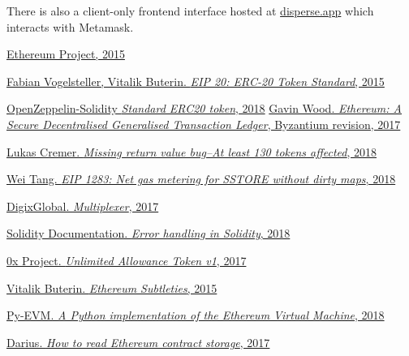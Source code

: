 \documentclass[12pt]{article}
\begin{document}
There is also a client-only frontend interface hosted at \href{https://disperse.app/}{disperse.app} which interacts with Metamask.

\begin{thebibliography}{1}

 \href{https://www.ethereum.org}{Ethereum Project, 2015}
 
  \href{https://eips.ethereum.org/EIPS/eip-20}{Fabian Vogelsteller, Vitalik Buterin. {\em EIP 20: ERC-20 Token Standard}, 2015}

  \href{https://github.com/OpenZeppelin/openzeppelin-solidity/blob/v2.0.0/contracts/token/ERC20/ERC20.sol#L151-L164}{OpenZeppelin-Solidity {\em Standard ERC20 token}, 2018}
  \href{http://gavwood.com/paper.pdf}{Gavin Wood. {\em Ethereum: A Secure Decentralised Generalised Transaction Ledger}, Byzantium revision, 2017}
 	
  \href{https://medium.com/p/d67bf08521ca}{Lukas Cremer. {\em Missing return value bug--At least 130 tokens affected}, 2018}
 	
  \href{https://eips.ethereum.org/EIPS/eip-1283}{Wei Tang. {\em EIP 1283: Net gas metering for SSTORE without dirty maps}, 2018}
 	
  \href{https://github.com/DigixGlobal/multiplexer}{DigixGlobal. {\em Multiplexer}, 2017}
 	
  \href{https://solidity.readthedocs.io/en/latest/control-structures.html#error-handling-assert-require-revert-and-exceptions}{Solidity Documentation. {\em Error handling in Solidity}, 2018}
 	
  \href{https://github.com/0xProject/0x-monorepo/blob/48ff13e3e22bf9f71bc1a367f86aaa0ae89989ae/packages/contracts/contracts/tokens/ZRXToken/UnlimitedAllowanceToken_v1.sol#L43-L45}{0x Project. {\em Unlimited Allowance Token v1}, 2017}
 
 \href{https://github.com/ethereum/wiki/wiki/Subtleties}{Vitalik Buterin. {\em Ethereum Subtleties}, 2015}
 
 \href{https://github.com/ethereum/py-evm}{Py-EVM. {\em A Python implementation of the Ethereum Virtual Machine}, 2018}

 \href{https://medium.com/aigang-network/how-to-read-ethereum-contract-storage-44252c8af925}{Darius. {\em How to read Ethereum contract storage}, 2017}

\end{thebibliography}
\end{document}

